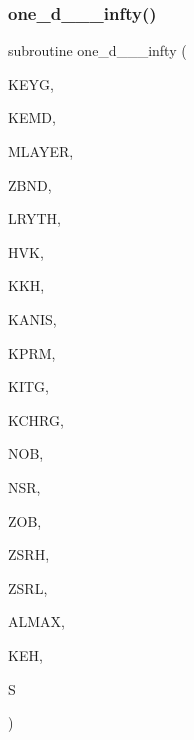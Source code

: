 \subsubsection{\texorpdfstring{one\+\_\+d\+\_\+\_\+\_\+infty()}{one\_d\_0\_2\_infty()}}
{\footnotesize\ttfamily subroutine one\+\_\+d\+\_\+\_\+\_\+infty (\begin{DoxyParamCaption}\item[{integer, intent(in)}]{K\+E\+YG,  }\item[{integer, intent(in)}]{K\+E\+MD,  }\item[{integer, intent(in)}]{M\+L\+A\+Y\+ER,  }\item[{real, dimension(0\+:mlayer), intent(in)}]{Z\+B\+ND,  }\item[{real, dimension(mlayer), intent(in)}]{L\+R\+Y\+TH,  }\item[{real, dimension(0\+:mlayer), intent(in)}]{H\+VK,  }\item[{complex, dimension(0\+:mlayer), intent(in)}]{K\+KH,  }\item[{integer, intent(in)}]{K\+A\+N\+IS,  }\item[{integer, intent(in)}]{K\+P\+RM,  }\item[{integer, intent(in)}]{K\+I\+TG,  }\item[{integer, intent(in)}]{K\+C\+H\+RG,  }\item[{integer, intent(in)}]{N\+OB,  }\item[{integer, intent(in)}]{N\+SR,  }\item[{real, intent(in)}]{Z\+OB,  }\item[{real, intent(in)}]{Z\+S\+RH,  }\item[{real, intent(in)}]{Z\+S\+RL,  }\item[{real, intent(in)}]{A\+L\+M\+AX,  }\item[{integer, intent(in)}]{K\+EH,  }\item[{complex, dimension(4), intent(out)}]{S }\end{DoxyParamCaption})}

